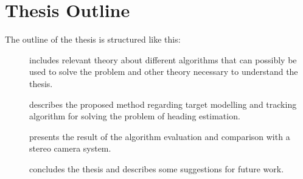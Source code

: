 \section{Thesis Outline}
The outline of the thesis is structured like this:
\begin{description}
    \item[] includes relevant theory about different algorithms that can possibly be used to solve the problem and other theory necessary to understand the thesis.

    \item[] describes the proposed method regarding target modelling and tracking algorithm for solving the problem of heading estimation.

    \item[] presents the result of the algorithm evaluation and comparison with a stereo camera system.

    \item[] concludes the thesis and describes some suggestions for future work.
\end{description}
